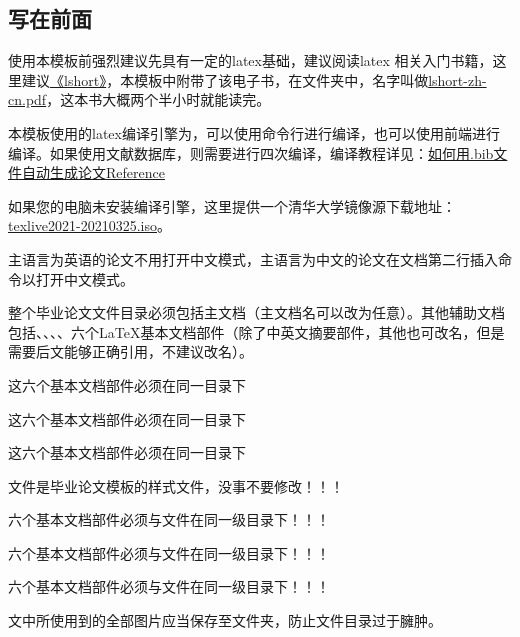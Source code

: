 \documentclass{nitthesis}
\begin{document}
\MakeSubmitPage
\MakeCover
\MakeAbstract

\MakeContent

\newpage

\subsection{写在前面}

使用本模板前强烈建议先具有一定的latex基础，建议阅读latex 相关入门书籍，这里建议\href{file:doc/lshort-zh-cn.pdf}{《lshort》}，本模板中附带了该电子书，在文件夹中，名字叫做\href{doc/lshort-zh-cn.pdf}{lshort-zh-cn.pdf}，这本书大概两个半小时就能读完。

本模板使用的latex编译引擎为，可以使用命令行进行编译，也可以使用前端进行编译。如果使用文献数据库，则需要进行四次编译，编译教程详见：\href{https://blog.csdn.net/tmylzq187/article/details/51355261}{如何用.bib文件自动生成论文Reference}

如果您的电脑未安装\LaTeXe{}编译引擎，这里提供一个清华大学镜像源下载地址：\href{https://mirrors.tuna.tsinghua.edu.cn/CTAN/systems/texlive/Images/texlive2021-20210325.iso}{texlive2021-20210325.iso}。

主语言为英语的论文不用打开中文模式，主语言为中文的论文在文档第二行插入命令以打开中文模式。

整个毕业论文文件目录必须包括主文档（主文档名可以改为任意）。其他辅助文档包括、、、、六个\LaTeX{}基本文档部件（除了中英文摘要部件，其他也可改名，但是需要后文能够正确引用，不建议改名）。

这六个基本文档部件必须在同一目录下

这六个基本文档部件必须在同一目录下

这六个基本文档部件必须在同一目录下

文件是毕业论文模板的样式文件，没事不要修改！！！

六个基本文档部件必须与文件在同一级目录下！！！

六个基本文档部件必须与文件在同一级目录下！！！

六个基本文档部件必须与文件在同一级目录下！！！


文中所使用到的全部图片应当保存至文件夹，防止文件目录过于臃肿。
\end{document}
